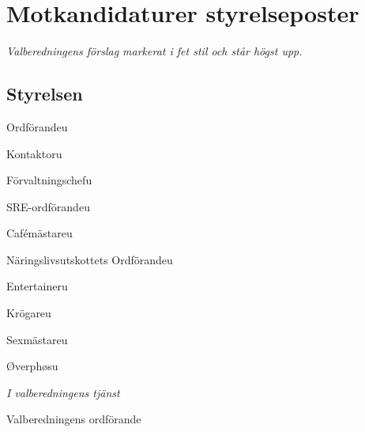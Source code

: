 \documentclass[10pt]{article}
\def\doctype{Sena Handlingar} %
\def\mname{Valmötet} %
\def\mnum{VM/19} %
\def\date{2019-11-26} %
\def\mtime{17:15}
\def\place{E:A}
\begin{document}
    
    
   
   
   \section{Motkandidaturer styrelseposter}
   \emph{Valberedningens förslag markerat i fet stil och står högst upp.}
   
   \subsection{Styrelsen}
   
   \begin{vallista}
        \begin{post}{Ordförande}{u} %
        \end{post}
        \begin{post}{Kontaktor}{u}
        \end{post}
        \begin{post}{Förvaltningschef}{u}
        \end{post}
        \begin{post}{SRE-ordförande}{u}
        \end{post}
        \begin{post}{Cafémästare}{u}
        \end{post}
        \begin{post}{Näringslivsutskottets Ordförande}{u}
        \end{post}
        \begin{post}{Entertainer}{u}
        \end{post}
        \begin{post}{Krögare}{u}
        \end{post}
        \begin{post}{Sexmästare}{u}
        \end{post}
        \begin{post}{Øverphøs}{u}
        \end{post}
    \end{vallista}
    


    \begin{signatures}{1}
        \emph{I valberedningens tjänst}
        \signature{Axel Voss}{Valberedningens ordförande}
    \end{signatures}
    
    
\end{document}
